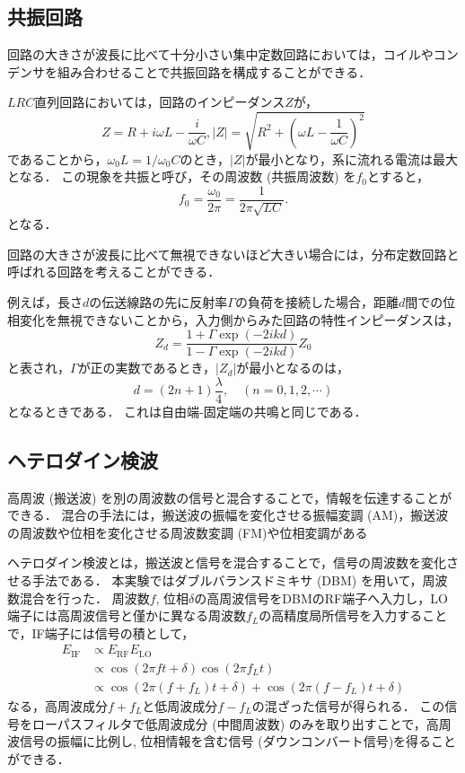\documentclass[uplatex,dvipdfmx,a4j,12pt]{jsarticle}
\begin{document}
\subsection{共振回路}
回路の大きさが波長に比べて十分小さい集中定数回路においては，コイルやコンデンサを組み合わせることで共振回路を構成することができる．

$LRC$直列回路においては，回路のインピーダンス$Z$が，
\begin{equation}
  Z = R + i\omega L - \frac{i}{\omega C}, |Z| = \sqrt{R^2 + \left(\omega L - \frac{1}{\omega C}\right)^2}
\end{equation}
であることから，$\omega_0 L = 1/\omega_0 C$のとき，$|Z|$が最小となり，系に流れる電流は最大となる．
この現象を共振と呼び，その周波数 (共振周波数) を$f_0$とすると，
\begin{equation}
  f_0 = \frac{\omega_0}{2\pi} = \frac{1}{2\pi\sqrt{LC}}.
\end{equation}
となる．

回路の大きさが波長に比べて無視できないほど大きい場合には，分布定数回路と呼ばれる回路を考えることができる．

例えば，長さ$d$の伝送線路の先に反射率$\Gamma$の負荷を接続した場合，距離$d$間での位相変化を無視できないことから，入力側からみた回路の特性インピーダンスは，
\begin{equation}
  Z_d = \frac{1+\Gamma \exp{(-2ikd)}}{1-\Gamma \exp{(-2ikd)}}Z_0
\end{equation}
と表され，$\Gamma$が正の実数であるとき，$|Z_d|$が最小となるのは，
\begin{equation}
  d = (2n + 1)\frac{\lambda}{4}, \quad (n = 0, 1, 2, \cdots)
\end{equation}
となるときである．
これは自由端-固定端の共鳴と同じである．

\subsection{ヘテロダイン検波}
高周波 (搬送波) を別の周波数の信号と混合することで，情報を伝達することができる．
混合の手法には，搬送波の振幅を変化させる振幅変調 (AM)，搬送波の周波数や位相を変化させる周波数変調 (FM)や位相変調がある

ヘテロダイン検波とは，搬送波と信号を混合することで，信号の周波数を変化させる手法である．
本実験ではダブルバランスドミキサ (DBM) を用いて，周波数混合を行った．
周波数$f$, 位相$\delta$の高周波信号をDBMのRF端子へ入力し，LO端子には高周波信号と僅かに異なる周波数$f_L$の高精度局所信号を入力することで，IF端子には信号の積として，
\begin{align}
  E_\mathrm{IF} &\propto E_\mathrm{RF} E_\mathrm{LO} \nonumber \\
  &\propto \cos\left(2\pi f t + \delta\right) \cos\left(2\pi f_L t\right) \nonumber \\
  &\propto \cos\left(2\pi (f + f_L) t + \delta\right) + \cos\left(2\pi (f - f_L) t + \delta\right)
\end{align}
なる，高周波成分$f + f_L$と低周波成分$f - f_L$の混ざった信号が得られる．
この信号をローパスフィルタで低周波成分 (中間周波数) のみを取り出すことで，高周波信号の振幅に比例し, 位相情報を含む信号 (ダウンコンバート信号)を得ることができる．
\end{document}
